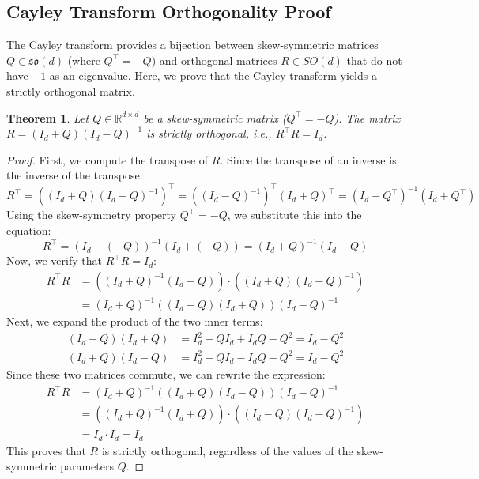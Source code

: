 \documentclass{article}
\theoremstyle{plain}
\newtheorem{theorem}{Theorem}[section]
\theoremstyle{definition}
\theoremstyle{remark}
\begin{document}
\subsection{Cayley Transform Orthogonality Proof}
The Cayley transform provides a bijection between skew-symmetric matrices $Q \in \mathfrak{so}(d)$ (where $Q^\top = -Q$) and orthogonal matrices $R \in SO(d)$ that do not have $-1$ as an eigenvalue. Here, we prove that the Cayley transform yields a strictly orthogonal matrix.

\begin{theorem}
Let $Q \in \mathbb{R}^{d \times d}$ be a skew-symmetric matrix ($Q^\top = -Q$). The matrix $R = (I_d + Q)(I_d - Q)^{-1}$ is strictly orthogonal, i.e., $R^\top R = I_d$.
\end{theorem}

\begin{proof}
First, we compute the transpose of $R$. Since the transpose of an inverse is the inverse of the transpose:
\begin{equation}
R^\top = \left( (I_d + Q)(I_d - Q)^{-1} \right)^\top = \left( (I_d - Q)^{-1} \right)^\top (I_d + Q)^\top = (I_d - Q^\top)^{-1} (I_d + Q^\top)
\end{equation}
Using the skew-symmetry property $Q^\top = -Q$, we substitute this into the equation:
\begin{equation}
R^\top = (I_d - (-Q))^{-1} (I_d + (-Q)) = (I_d + Q)^{-1} (I_d - Q)
\end{equation}
Now, we verify that $R^\top R = I_d$:
\begin{align}
R^\top R &= \left( (I_d + Q)^{-1} (I_d - Q) \right) \cdot \left( (I_d + Q)(I_d - Q)^{-1} \right) \nonumber \\
&= (I_d + Q)^{-1} \left( (I_d - Q) (I_d + Q) \right) (I_d - Q)^{-1}
\end{align}
Next, we expand the product of the two inner terms:
\begin{align}
(I_d - Q)(I_d + Q) &= I_d^2 - Q I_d + I_d Q - Q^2 = I_d - Q^2 \nonumber \\
(I_d + Q)(I_d - Q) &= I_d^2 + Q I_d - I_d Q - Q^2 = I_d - Q^2
\end{align}
Since these two matrices commute, we can rewrite the expression:
\begin{align}
R^\top R &= (I_d + Q)^{-1} \left( (I_d + Q)(I_d - Q) \right) (I_d - Q)^{-1} \nonumber \\
&= \left( (I_d + Q)^{-1} (I_d + Q) \right) \cdot \left( (I_d - Q) (I_d - Q)^{-1} \right) \nonumber \\
&= I_d \cdot I_d = I_d
\end{align}
This proves that $R$ is strictly orthogonal, regardless of the values of the skew-symmetric parameters $Q$.
\end{proof}
\end{document}
